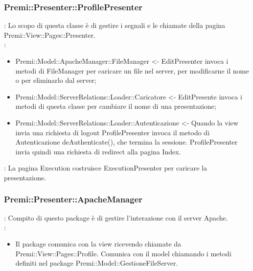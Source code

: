 {						\subsubsection{Premi::Presenter::ProfilePresenter}{
										\textbf{\tipo}: Lo scopo di questa classe è di gestire i segnali e le chiamate della pagina Premi::View::Pages::Presenter.\\	
										\textbf{\relaz}:
											\begin{itemize}
												\item Premi::Model::ApacheManager::FileManager <- EditPresenter invoca i metodi di FileManager per caricare un file nel server, per modificarne il nome o per eliminarlo dal server;
												\item Premi::Model::ServerRelations::Loader::Caricatore <- EditPresente invoca i metodi di questa classe per cambiare il nome di una presentazione;
												\item Premi::Model::ServerRelations::Loader::Autenticazione <- Quando la view invia una richiesta di logout ProfilePresenter invoca il metodo di Autenticazione deAuthenticate(), che termina la sessione. ProfilePresenter invia quindi una richiesta di redirect alla pagina Index.
											\end{itemize}
										\textbf{\interfacce}: La pagina Execution costruisce ExecutionPresenter per caricare la presentazione.\\
								}
\subsubsection{Premi::Presenter::ApacheManager}{
		\textbf{\tipo}: Compito di questo package è di gestire l'interazione con il server Apache.\\
		\textbf{\relaz}:
		\begin{itemize}
			\item Il package comunica con la view ricevendo chiamate da Premi::View::Pages::Profile. Comunica con il model chiamando i metodi definiti nel package Premi::Model::GestioneFileServer.
		\end{itemize}
		
}}
